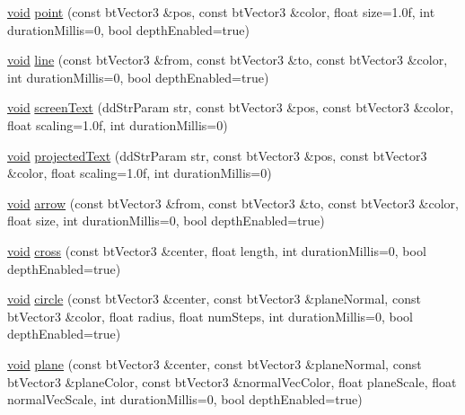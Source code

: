 \begin{DoxyCompactItemize}
\item 
\mbox{\hyperlink{_thread_8h_af1e856da2e658414cb2456cb6f7ebc66}{void}} \mbox{\hyperlink{classnjli_1_1_world_debug_drawer_a9de791d9497b36d0f19980cf301d05f6}{point}} (const bt\+Vector3 \&pos, const bt\+Vector3 \&color, float size=1.\+0f, int duration\+Millis=0, bool depth\+Enabled=true)
\item 
\mbox{\hyperlink{_thread_8h_af1e856da2e658414cb2456cb6f7ebc66}{void}} \mbox{\hyperlink{classnjli_1_1_world_debug_drawer_ab8577e1631222c8a64ba370b4e62daa6}{line}} (const bt\+Vector3 \&from, const bt\+Vector3 \&to, const bt\+Vector3 \&color, int duration\+Millis=0, bool depth\+Enabled=true)
\item 
\mbox{\hyperlink{_thread_8h_af1e856da2e658414cb2456cb6f7ebc66}{void}} \mbox{\hyperlink{classnjli_1_1_world_debug_drawer_a014bce3199ffded2f0577eb3c9a8bf19}{screen\+Text}} (dd\+Str\+Param str, const bt\+Vector3 \&pos, const bt\+Vector3 \&color, float scaling=1.\+0f, int duration\+Millis=0)
\item 
\mbox{\hyperlink{_thread_8h_af1e856da2e658414cb2456cb6f7ebc66}{void}} \mbox{\hyperlink{classnjli_1_1_world_debug_drawer_acac1c29c7c13b5afb9553c38f304af47}{projected\+Text}} (dd\+Str\+Param str, const bt\+Vector3 \&pos, const bt\+Vector3 \&color, float scaling=1.\+0f, int duration\+Millis=0)
\item 
\mbox{\hyperlink{_thread_8h_af1e856da2e658414cb2456cb6f7ebc66}{void}} \mbox{\hyperlink{classnjli_1_1_world_debug_drawer_a247723d82e67043e246c9cf601e9a5e4}{arrow}} (const bt\+Vector3 \&from, const bt\+Vector3 \&to, const bt\+Vector3 \&color, float size, int duration\+Millis=0, bool depth\+Enabled=true)
\item 
\mbox{\hyperlink{_thread_8h_af1e856da2e658414cb2456cb6f7ebc66}{void}} \mbox{\hyperlink{classnjli_1_1_world_debug_drawer_afaf93a608f1cbda884f660ef626d7891}{cross}} (const bt\+Vector3 \&center, float length, int duration\+Millis=0, bool depth\+Enabled=true)
\item 
\mbox{\hyperlink{_thread_8h_af1e856da2e658414cb2456cb6f7ebc66}{void}} \mbox{\hyperlink{classnjli_1_1_world_debug_drawer_adec61e26c61222671eeaae5818750ee2}{circle}} (const bt\+Vector3 \&center, const bt\+Vector3 \&plane\+Normal, const bt\+Vector3 \&color, float radius, float num\+Steps, int duration\+Millis=0, bool depth\+Enabled=true)
\item 
\mbox{\hyperlink{_thread_8h_af1e856da2e658414cb2456cb6f7ebc66}{void}} \mbox{\hyperlink{classnjli_1_1_world_debug_drawer_a7a947904ddfe6665fc69fc9d04017f23}{plane}} (const bt\+Vector3 \&center, const bt\+Vector3 \&plane\+Normal, const bt\+Vector3 \&plane\+Color, const bt\+Vector3 \&normal\+Vec\+Color, float plane\+Scale, float normal\+Vec\+Scale, int duration\+Millis=0, bool depth\+Enabled=true)

\end{DoxyCompactItemize}
